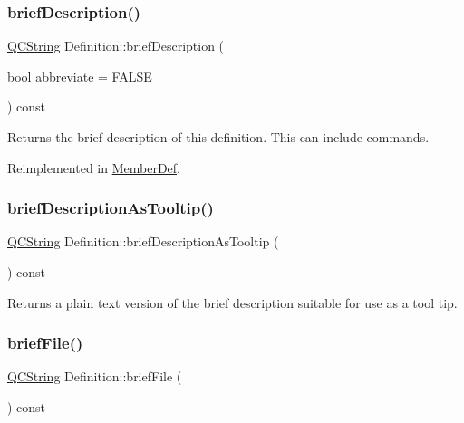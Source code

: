 \mbox{\label{class_definition_a5c10fdd766133b46d61d28a77b65426e}} 
\subsubsection{\texorpdfstring{briefDescription()}{briefDescription()}}
{\footnotesize\ttfamily \mbox{\hyperlink{class_q_c_string}{Q\+C\+String}} Definition\+::brief\+Description (\begin{DoxyParamCaption}\item[{bool}]{abbreviate = {\ttfamily FALSE} }\end{DoxyParamCaption}) const\hspace{0.3cm}{\ttfamily [virtual]}}

Returns the brief description of this definition. This can include commands. 

Reimplemented in \mbox{\hyperlink{class_member_def_ab4ad34e63730bc94f076b920b3b9084e}{Member\+Def}}.

\mbox{\label{class_definition_a542dc2b80623c11dc2945f6ae1e1a10b}} 
\subsubsection{\texorpdfstring{briefDescriptionAsTooltip()}{briefDescriptionAsTooltip()}}
{\footnotesize\ttfamily \mbox{\hyperlink{class_q_c_string}{Q\+C\+String}} Definition\+::brief\+Description\+As\+Tooltip (\begin{DoxyParamCaption}{ }\end{DoxyParamCaption}) const}

Returns a plain text version of the brief description suitable for use as a tool tip. \mbox{\label{class_definition_a7517dda8109eca884911ac31b42faf3c}} 
\subsubsection{\texorpdfstring{briefFile()}{briefFile()}}
{\footnotesize\ttfamily \mbox{\hyperlink{class_q_c_string}{Q\+C\+String}} Definition\+::brief\+File (\begin{DoxyParamCaption}{ }\end{DoxyParamCaption}) const}

